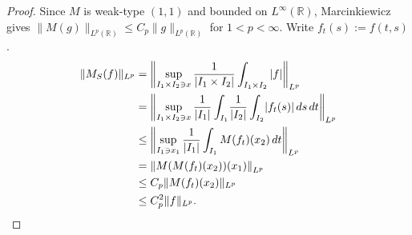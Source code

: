 \documentclass[12pt]{article}
\begin{document}
\begin{proof}
Since $M$ is weak-type $(1,1)$ and bounded on $L^\infty(\mathbb{R})$, Marcinkiewicz gives
$\|M(g)\|_{L^p(\mathbb{R})}\leq C_p\|g\|_{L^p(\mathbb{R})}$ for $1<p<\infty$. Write $f_t(s):=f(t,s)$.
\begin{align*}
  \|M_S(f)\|_{L^p}
  &= \left\|\sup_{I_1\times I_2\ni x}\frac{1}{|I_1\times I_2|}\int_{I_1\times I_2}|f|\right\|_{L^p} \\
  &= \left\|\sup_{I_1\times I_2\ni x}\frac{1}{|I_1|}\int_{I_1}\!\frac{1}{|I_2|}\int_{I_2}\!|f_t(s)|\,ds\,dt\right\|_{L^p} \\
  &\leq \left\|\sup_{I_1\ni x_1}\frac{1}{|I_1|}\int_{I_1}M(f_t)(x_2)\,dt\right\|_{L^p} \\
  &= \left\|M(M(f_t)(x_2))(x_1)\right\|_{L^p} \\
  &\leq C_p\|M(f_t)(x_2)\|_{L^p} \\
  &\leq C_p^2\|f\|_{L^p}. \qedhere
\end{align*}
\end{proof}
\end{document}
